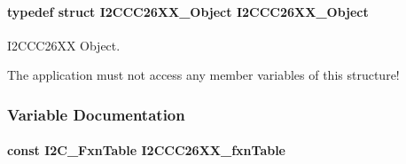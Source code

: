 \paragraph[{I2\-C\-C\-C26\-X\-X\-\_\-\-Object}]{\setlength{\rightskip}{0pt plus 5cm}typedef struct {\bf I2\-C\-C\-C26\-X\-X\-\_\-\-Object}  {\bf I2\-C\-C\-C26\-X\-X\-\_\-\-Object}}\label{_i2_c_c_c26_x_x_8h_a0eb1b66d08f9584c404d1610f8282394}


I2\-C\-C\-C26\-X\-X Object. 

The application must not access any member variables of this structure! 

\subsubsection{Variable Documentation}
\paragraph[{I2\-C\-C\-C26\-X\-X\-\_\-fxn\-Table}]{\setlength{\rightskip}{0pt plus 5cm}const {\bf I2\-C\-\_\-\-Fxn\-Table} I2\-C\-C\-C26\-X\-X\-\_\-fxn\-Table}\label{_i2_c_c_c26_x_x_8h_a6fb66ad0052e9ab9d1c1b65b8276fc61}
